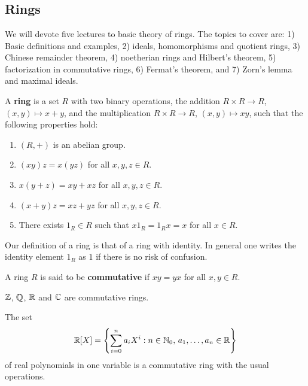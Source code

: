 \chapter{}

\section*{Rings}

We will devote five lectures to basic theory of rings. The topics to cover are:
1) Basic definitions and examples, 2) ideals, homomorphisms and quotient rings,
3) Chinese remainder theorem, 
4) noetherian rings and Hilbert's theorem, 
5) factorization in commutative rings, 
6) Fermat's theorem, and 
7) Zorn's lemma and maximal ideals. 

\begin{definition}
A \textbf{ring} is a set $R$ with two binary operations, the addition
$R\times R\to R$, $(x,y)\mapsto x+y$, and the multiplication
$R\times R\to R$, $(x,y)\mapsto xy$, such that
the following properties hold:
\begin{enumerate}
    \item $(R,+)$ is an abelian group.
    \item $(xy)z=x(yz)$ for all $x,y,z\in R$.
    \item $x(y+z)=xy+xz$ for all $x,y,z\in R$.
    \item $(x+y)z=xz+yz$ for all $x,y,z\in R$.
    \item There exists $1_R\in R$ such that $x1_R=1_Rx=x$ for all $x\in R$.
\end{enumerate}
\end{definition}

Our definition of a ring is that of a ring with identity. In general one
writes the identity element $1_R$ as $1$ if there is no risk of confusion.

\begin{definition}
A ring $R$ is said to be \textbf{commutative} if $xy=yx$ for all $x,y\in R$. 
\end{definition}

\begin{example}
$\mathbb{Z}$, $\mathbb{Q}$, $\mathbb{R}$ and $\mathbb{C}$ are commutative rings.
\end{example}

\begin{example}
    The set  
    \[
    \mathbb{R}[X]=\left\{\sum_{i=0}^na_iX^i:n\in\mathbb{N}_0,\,a_1,\dots,a_n\in \mathbb{R}\right\}
    \]
    of real polynomials in one variable 
    is a commutative ring with the usual operations. 
\end{example}

